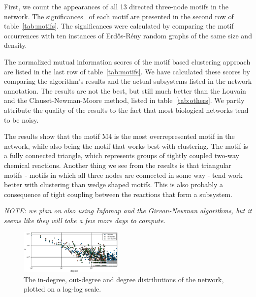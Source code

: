 First, we count the appearances of all 13 directed three-node motifs in the
network. The significances~\cite{milo2002network} of each motif are presented in
the second row of table~\ref{tab:motifs}. The significances were calculated by
comparing the motif occurrences with ten instances of Erdős-Rény random graphs
of the same size and density.

The normalized mutual information scores of the motif based clustering approach
are listed in the last row of table~\ref{tab:motifs}. We have calculated these
scores by comparing the algorithm's results and the actual subsystems listed in
the network annotation. The results are not the best, but still much better than
the Louvain and the Clauset-Newman-Moore method, listed in
table~\ref{tab:others}. We partly attribute the quality of the results to the
fact that most biological networks tend to be noisy.

The results show that the motif M4 is the most overrepresented motif in the
network, while also being the motif that works best with clustering. The motif
is a fully connected triangle, which represents groups of tightly coupled
two-way chemical reactions. Another thing we see from the results is that
triangular motifs - motifs in which all three nodes are connected in some way -
tend work better with clustering than wedge shaped motifs. This is also probably
a consequence of tight coupling between the reactions that form a subsystem.

\emph{NOTE: we plan on also using Infomap and the Girvan-Newman algorithms, but
  it seems like they will take a few more days to compute.}

\begin{figure}
  \includegraphics[width=0.45\textwidth]{../plots/degreesmall}
  \caption{The in-degree, out-degree and degree distributions of the network,
    plotted on a log-log scale.}
  \label{fig:dist}
\end{figure}

